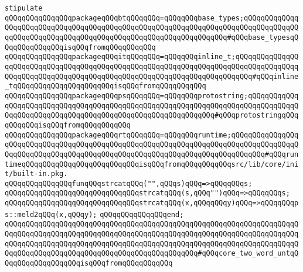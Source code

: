 \newline
\newline
\newline
\newline
\newline
\verb|stipulate|\newline
\verb|qQQqqQQqqQQqqQQqpackageqQQqbtqQQqqQQq=qQQqqQQqbase_types;qQQqqQQqqQQqqQQqqQQqqQQqqQQqqQQqqQQqqQQqqQQqqQQqqQQqqQQqqQQqqQQqqQQqqQQqqQQqqQQqqQQqqQQqqQQqqQQqqQQqqQQqqQQqqQQqqQQqqQQqqQQqqQQqqQQqqQQq#qQQqbase_typesqQQqqQQqqQQqqQQqisqQQqfromqQQqqQQqqQQq|\newline
\verb|qQQqqQQqqQQqqQQqpackageqQQqitqQQqqQQq=qQQqqQQqinline_t;qQQqqQQqqQQqqQQqqQQqqQQqqQQqqQQqqQQqqQQqqQQqqQQqqQQqqQQqqQQqqQQqqQQqqQQqqQQqqQQqqQQqqQQqqQQqqQQqqQQqqQQqqQQqqQQqqQQqqQQqqQQqqQQqqQQqqQQqqQQqqQQq#qQQqinline_tqQQqqQQqqQQqqQQqqQQqqQQqisqQQqfromqQQqqQQqqQQq|\newline
\verb|qQQqqQQqqQQqqQQqpackageqQQqpsqQQqqQQq=qQQqqQQqprotostring;qQQqqQQqqQQqqQQqqQQqqQQqqQQqqQQqqQQqqQQqqQQqqQQqqQQqqQQqqQQqqQQqqQQqqQQqqQQqqQQqqQQqqQQqqQQqqQQqqQQqqQQqqQQqqQQqqQQqqQQqqQQqqQQqqQQq#qQQqprotostringqQQqqQQqqQQqisqQQqfromqQQqqQQqqQQq|\newline
\verb|qQQqqQQqqQQqqQQqpackageqQQqrtqQQqqQQq=qQQqqQQqruntime;qQQqqQQqqQQqqQQqqQQqqQQqqQQqqQQqqQQqqQQqqQQqqQQqqQQqqQQqqQQqqQQqqQQqqQQqqQQqqQQqqQQqqQQqqQQqqQQqqQQqqQQqqQQqqQQqqQQqqQQqqQQqqQQqqQQqqQQqqQQqqQQqqQQq#qQQqruntimeqQQqqQQqqQQqqQQqqQQqqQQqqQQqisqQQqfromqQQqqQQqqQQqsrc/lib/core/init/built-in.pkg.|\newline
\newline
\verb|qQQqqQQqqQQqqQQqfunqQQqstrcatqQQq("",qQQqs)qQQq=>qQQqqQQqs;|\newline
\verb|qQQqqQQqqQQqqQQqqQQqqQQqqQQqqQQqstrcatqQQq(s,qQQq"")qQQq=>qQQqqQQqs;|\newline
\verb|qQQqqQQqqQQqqQQqqQQqqQQqqQQqqQQqstrcatqQQq(x,qQQqqQQqy)qQQq=>qQQqqQQqps::meld2qQQq(x,qQQqy);|\newline
\verb|qQQqqQQqqQQqqQQqend;|\newline
\newline
\verb|qQQqqQQqqQQqqQQqqQQqqQQqqQQqqQQqqQQqqQQqqQQqqQQqqQQqqQQqqQQqqQQqqQQqqQQqqQQqqQQqqQQqqQQqqQQqqQQqqQQqqQQqqQQqqQQqqQQqqQQqqQQqqQQqqQQqqQQqqQQqqQQqqQQqqQQqqQQqqQQqqQQqqQQqqQQqqQQqqQQqqQQqqQQqqQQqqQQqqQQqqQQqqQQqqQQqqQQqqQQqqQQqqQQqqQQqqQQqqQQqqQQqqQQqqQQqqQQq#qQQqcore_two_word_untqQQqqQQqqQQqqQQqqQQqisqQQqfromqQQqqQQqqQQq|\newline
